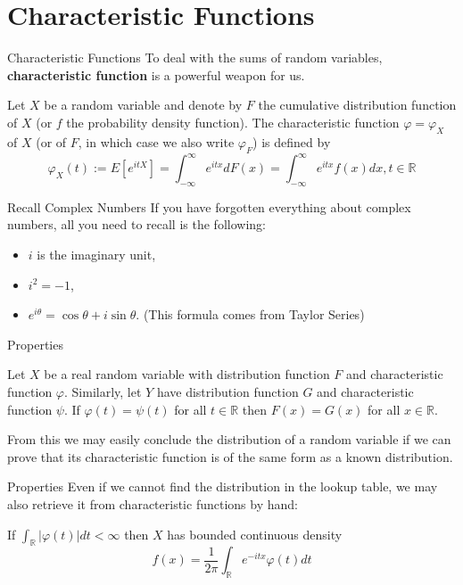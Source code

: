 \documentclass{beamer}
\newcommand{\reals}{\mathbb{R}}
\begin{document}
\section{Characteristic Functions}
\begin{frame}{Characteristic Functions}
	To deal with the sums of random variables, \textbf{characteristic function} is a powerful weapon for us.
		\begin{definition}
			Let $X$ be a random variable and denote by $F$ the cumulative distribution function of $X$ (or $f$ the probability density function). The characteristic function $\varphi=\varphi_X$ of $X$ (or of $F$, in which case we also write $\varphi_F$) is defined by
			$$\varphi_X(t):=E[e^{itX}]=\int_{-\infty}^\infty e^{itx}dF(x)=\int_{-\infty}^\infty e^{itx}f(x)dx, t\in\reals$$
		\end{definition}
\end{frame}
\begin{frame}{Recall Complex Numbers}
	If you have forgotten everything about complex numbers, all you need to recall is the following:
	\begin{itemize}
		\item $i$ is the imaginary unit,
		\item $i^2=-1$,
		\item $e^{i\theta} = \cos\theta + i\sin\theta$. (This formula comes from Taylor Series)
	\end{itemize}
\end{frame}
\begin{frame}{Properties}
	\begin{theorem}
		Let $X$ be a real random variable with distribution function
		$F$ and characteristic function $\varphi$. Similarly, let $Y$ have distribution
		function $G$ and characteristic function $\psi$. If $\varphi(t) = \psi(t)$ for all $t\in\reals$
		then $F(x) = G(x)$ for all $x \in\reals$.
	\end{theorem}
		From this we may easily conclude the distribution of a random variable if we can prove that its characteristic function is of the same form as a known distribution.
\end{frame}
\begin{frame}{Properties}
	Even if we cannot find the distribution in the lookup table, we may also retrieve it from characteristic functions by hand: \pause
	\begin{theorem}
		If $\int_\reals |\varphi(t)| dt < \infty$ then $X$ has bounded continuous density
		$$
		f(x) = \frac1{2\pi} \int_\reals e^{-itx}\varphi(t)dt
		$$
	\end{theorem}
\end{frame}
\end{document}

